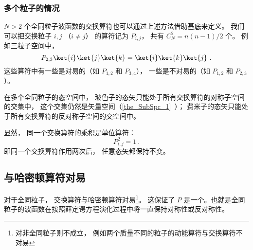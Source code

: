 \subsubsection{多个粒子的情况}
$N > 2$ 个全同粒子波函数的交换算符也可以通过上述方法借助基底来定义。 我们可以把交换粒子 $i,j$ （$i\ne j$） 的算符记为 $P_{i,j}$， 共有 $C_N^2 = n(n-1)/2$ 个。 例如三粒子空间中，
\begin{equation}
P_{2,3} \ket{i}\ket{j}\ket{k} = \ket{i}\ket{k}\ket{j}~.
\end{equation}
这些算符中有一些是对易的（如 $P_{1,2}$ 和 $P_{3,4}$）， 一些是不对易的（如 $P_{1,2}$ 和 $P_{2,3}$）。

在多个全同粒子的态空间中， 玻色子的态矢只能处于所有交换算符的对称子空间的交集中， 这个交集仍然是矢量空间（\autoref{the_SubSpc_1}~）； 费米子的态矢只能处于所有交换算符的反对称子空间的交空间中。

显然， 同一个交换算符的乘积是单位算符：
\begin{equation}\label{eq_ExchOp_7}
P_{i,j}^2 = 1~.
\end{equation}
即同一个交换算符作用两次后， 任意态矢都保持不变。

\subsection{与哈密顿算符对易}

对于全同粒子， 交换算符与哈密顿算符对易\footnote{对非全同粒子则不成立， 例如两个质量不同的粒子的动能算符与交换算符不对易}。 这保证了 $P$ 是一个。也就是全同粒子的波函数在按照薛定谔方程演化过程中将一直保持对称性或反对称性。





